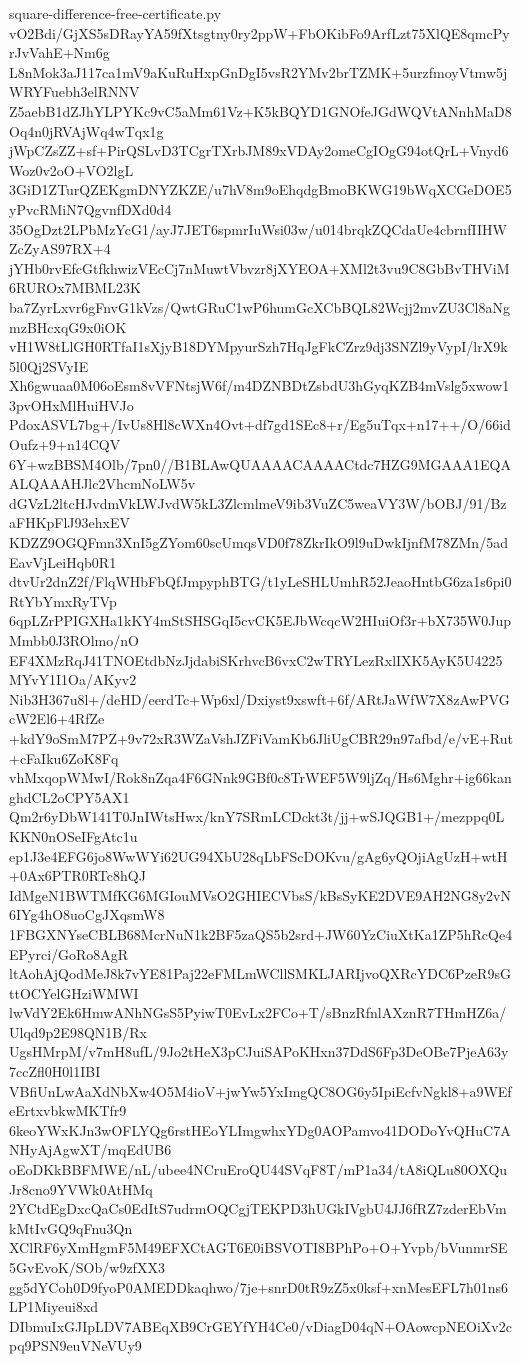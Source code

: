 \documentclass[11pt]{article}
\theoremstyle{definition}
\theoremstyle{remark}
\begin{document}
\begin{filecontents*}[overwrite]{square-difference-free-certificate.py}
vO2Bdi/GjXS5sDRayYA59fXtsgtny0ry2ppW+FbOKibFo9ArfLzt75XlQE8qmcPyrJvVahE+Nm6g
L8nMok3aJ117ca1mV9aKuRuHxpGnDgI5vsR2YMv2brTZMK+5urzfmoyVtmw5jWRYFuebh3elRNNV
Z5aebB1dZJhYLPYKc9vC5aMm61Vz+K5kBQYD1GNOfeJGdWQVtANnhMaD8Oq4n0jRVAjWq4wTqx1g
jWpCZsZZ+sf+PirQSLvD3TCgrTXrbJM89xVDAy2omeCgIOgG94otQrL+Vnyd6Woz0v2oO+VO2lgL
3GiD1ZTurQZEKgmDNYZKZE/u7hV8m9oEhqdgBmoBKWG19bWqXCGeDOE5yPvcRMiN7QgvnfDXd0d4
35OgDzt2LPbMzYcG1/ayJ7JET6spmrIuWsi03w/u014brqkZQCdaUe4cbrnfIIHWZcZyAS97RX+4
jYHb0rvEfcGtfkhwizVEcCj7nMuwtVbvzr8jXYEOA+XMl2t3vu9C8GbBvTHViM6RUROx7MBML23K
ba7ZyrLxvr6gFnvG1kVzs/QwtGRuC1wP6humGcXCbBQL82Wcjj2mvZU3Cl8aNgmzBHcxqG9x0iOK
vH1W8tLlGH0RTfaI1sXjyB18DYMpyurSzh7HqJgFkCZrz9dj3SNZl9yVypI/lrX9k5l0Qj2SVyIE
Xh6gwuaa0M06oEsm8vVFNtsjW6f/m4DZNBDtZsbdU3hGyqKZB4mVslg5xwow13pvOHxMlHuiHVJo
PdoxASVL7bg+/IvUs8Hl8cWXn4Ovt+df7gd1SEc8+r/Eg5uTqx+n17++/O/66idOufz+9+n14CQV
6Y+wzBBSM4Olb/7pn0//B1BLAwQUAAAACAAAACtdc7HZG9MGAAA1EQAALQAAAHJlc2VhcmNoLW5v
dGVzL2ltcHJvdmVkLWJvdW5kL3ZlcmlmeV9ib3VuZC5weaVY3W/bOBJ/91/BzaFHKpFlJ93ehxEV
KDZZ9OGQFmn3XnI5gZYom60scUmqsVD0f78ZkrIkO9l9uDwkIjnfM78ZMn/5adEavVjLeiHqb0R1
dtvUr2dnZ2f/FlqWHbFbQfJmpyphBTG/t1yLeSHLUmhR52JeaoHntbG6za1s6pi0RtYbYmxRyTVp
6qpLZrPPIGXHa1kKY4mStSHSGqI5cvCK5EJbWcqcW2HIuiOf3r+bX735W0JupMmbb0J3ROlmo/nO
EF4XMzRqJ41TNOEtdbNzJjdabiSKrhvcB6vxC2wTRYLezRxlIXK5AyK5U4225MYvY1I1Oa/AKyv2
Nib3H367u8l+/deHD/eerdTc+Wp6xl/Dxiyst9xswft+6f/ARtJaWfW7X8zAwPVGcW2El6+4RfZe
+kdY9oSmM7PZ+9v72xR3WZaVshJZFiVamKb6JliUgCBR29n97afbd/e/vE+Rut+cFaIku6ZoK8Fq
vhMxqopWMwI/Rok8nZqa4F6GNnk9GBf0c8TrWEF5W9ljZq/Hs6Mghr+ig66kanghdCL2oCPY5AX1
Qm2r6yDbW141T0JnIWtsHwx/knY7SRmLCDckt3t/jj+wSJQGB1+/mezppq0LKKN0nOSeIFgAtc1u
ep1J3e4EFG6jo8WwWYi62UG94XbU28qLbFScDOKvu/gAg6yQOjiAgUzH+wtH+0Ax6PTR0RTc8hQJ
IdMgeN1BWTMfKG6MGIouMVsO2GHIECVbsS/kBsSyKE2DVE9AH2NG8y2vN6IYg4hO8uoCgJXqsmW8
1FBGXNYseCBLB68McrNuN1k2BF5zaQS5b2srd+JW60YzCiuXtKa1ZP5hRcQe4EPyrci/GoRo8AgR
ltAohAjQodMeJ8k7vYE81Paj22eFMLmWCllSMKLJARIjvoQXRcYDC6PzeR9sGttOCYelGHziWMWI
lwVdY2Ek6HmwANhNGsS5PyiwT0EvLx2FCo+T/sBnzRfnlAXznR7THmHZ6a/Ulqd9p2E98QN1B/Rx
UgsHMrpM/v7mH8ufL/9Jo2tHeX3pCJuiSAPoKHxn37DdS6Fp3DeOBe7PjeA63y7ccZfl0H0l1IBI
VBfiUnLwAaXdNbXw4O5M4ioV+jwYw5YxImgQC8OG6y5IpiEcfvNgkl8+a9WEfeErtxvbkwMKTfr9
6keoYWxKJn3wOFLYQg6rstHEoYLImgwhxYDg0AOPamvo41DODoYvQHuC7ANHyAjAgwXT/mqEdUB6
oEoDKkBBFMWE/nL/ubee4NCruEroQU44SVqF8T/mP1a34/tA8iQLu80OXQuJr8cno9YVWk0AtHMq
2YCtdEgDxcQaCs0EdItS7udrmOQCgjTEKPD3hUGkIVgbU4JJ6fRZ7zderEbVmkMtIvGQ9qFnu3Qn
XClRF6yXmHgmF5M49EFXCtAGT6E0iBSVOTI8BPhPo+O+Yvpb/bVunmrSE5GvEvoK/SOb/w9zfXX3
gg5dYCoh0D9fyoP0AMEDDkaqhwo/7je+snrD0tR9zZ5x0ksf+xnMesEFL7h01ns6LP1Miyeui8xd
DIbmuIxGJIpLDV7ABEqXB9CrGEYfYH4Ce0/vDiagD04qN+OAowcpNEOiXv2cpq9PSN9euVNeVUy9

\end{filecontents*}
\end{document}

